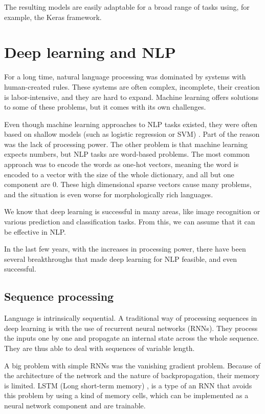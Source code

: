 \documentclass[
  printed, %
  color,   %
  table,   %
  oneside, %
  lof,     %
  lot,     %
]{fithesis3}
\begin{document}
The resulting models are easily adaptable for a broad range of tasks using, for example, the Keras framework.


\chapter{Deep learning and NLP}
For a long time, natural language processing was dominated by systems with human-created rules. These systems are often complex, incomplete, their creation is labor-intensive, and they are hard to expand. Machine learning offers solutions to some of these problems, but it comes with its own challenges.

Even though machine learning approaches to NLP tasks existed, they were often based on shallow models (such as logistic regression or SVM) \parencite{deepNLP}. Part of the reason was the lack of processing power. The other problem is that machine learning expects numbers, but NLP tasks are word-based problems. The most common approach was to encode the words as one-hot vectors, meaning the word is encoded to a vector with the size of the whole dictionary, and all but one component are 0.  These high dimensional sparse vectors cause many problems, and the situation is even worse for morphologically rich languages.

We know that deep learning\parencite{deepNLP} is successful in many areas, like image recognition or various prediction and classification tasks. From this, we can assume that it can be effective in NLP.

In the last few years, with the increases in processing power, there have been several breakthroughs that made deep learning for NLP feasible, and even successful.

\section{Sequence processing}
Language is intrinsically sequential. A traditional way of processing sequences in deep learning is with the use of recurrent neural networks (RNNs). They process the inputs one by one and propagate an internal state across the whole sequence. They are thus able to deal with sequences of variable length. 

A big problem with simple RNNs was the vanishing gradient problem. Because of the architecture of the network and the nature of backpropagation, their memory is limited. LSTM (Long short-term memory) \parencite{lstm}, \parencite{lstm-info} is a type of an RNN that avoids this problem by using a kind of memory cells, which can be implemented as a neural network component and are trainable.
\end{document}
